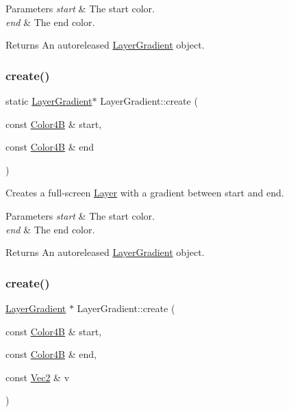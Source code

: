 \begin{DoxyParams}{Parameters}
{\em start} & The start color. \\
\hline
{\em end} & The end color. \\
\hline
\end{DoxyParams}
\begin{DoxyReturn}{Returns}
An autoreleased \hyperlink{classLayerGradient}{Layer\+Gradient} object. 
\end{DoxyReturn}
\mbox{\label{classLayerGradient_a06efc29db5ad6eee085053c19877d3e6}} 
\subsubsection{\texorpdfstring{create()}{create()}\hspace{0.1cm}{\footnotesize\ttfamily [4/6]}}
{\footnotesize\ttfamily static \hyperlink{classLayerGradient}{Layer\+Gradient}$\ast$ Layer\+Gradient\+::create (\begin{DoxyParamCaption}\item[{const \hyperlink{structColor4B}{Color4B} \&}]{start,  }\item[{const \hyperlink{structColor4B}{Color4B} \&}]{end }\end{DoxyParamCaption})\hspace{0.3cm}{\ttfamily [static]}}

Creates a full-\/screen \hyperlink{classLayer}{Layer} with a gradient between start and end.


\begin{DoxyParams}{Parameters}
{\em start} & The start color. \\
\hline
{\em end} & The end color. \\
\hline
\end{DoxyParams}
\begin{DoxyReturn}{Returns}
An autoreleased \hyperlink{classLayerGradient}{Layer\+Gradient} object. 
\end{DoxyReturn}
\mbox{\label{classLayerGradient_a6093b698c74a5773c202c5f0b3fd6ac3}} 
\subsubsection{\texorpdfstring{create()}{create()}\hspace{0.1cm}{\footnotesize\ttfamily [5/6]}}
{\footnotesize\ttfamily \hyperlink{classLayerGradient}{Layer\+Gradient} $\ast$ Layer\+Gradient\+::create (\begin{DoxyParamCaption}\item[{const \hyperlink{structColor4B}{Color4B} \&}]{start,  }\item[{const \hyperlink{structColor4B}{Color4B} \&}]{end,  }\item[{const \hyperlink{classVec2}{Vec2} \&}]{v }\end{DoxyParamCaption})\hspace{0.3cm}{\ttfamily [static]}}

